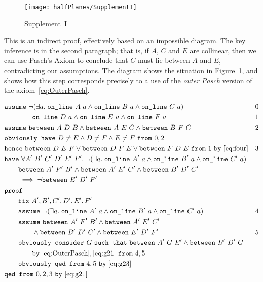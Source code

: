 \begin{figure}
  \centering\texttt{[image: halfPlanes/SupplementI]}
  \caption{Supplement~I}
  \label{fig:SupplementI}
\end{figure}

This is an indirect proof, effectively based on an impossible diagram. The key inference is in the second paragraph; that is, if $A$, $C$ and $E$ are collinear, then we can use Pasch's Axiom to conclude that $C$ must lie between $A$ and $E$, contradicting our assumptions. The diagram shows the situation in Figure~\ref{fig:SupplementI}, and shows how this step corresponds precisely to a use of the \emph{outer Pasch} version of the axiom~\eqref{eq:OuterPasch}.

\begin{boxedfigure}
  \small
  \begin{align*}
    &\code{assume}\ \Triangle{a}{A}{B}{C} & 0\\
    &\qquad\qquad \code{on\_line}\ D\ a \wedge \code{on\_line}\ E\ a \wedge \code{on\_line}\ F\ a & 1\\
    &\code{assume}\ \between{A}{D}{B} \wedge \between{A}{E}{C} \wedge \between{B}{F}{C} & 2\\
    &\code{obviously have}\ D\neq E \wedge D\neq F \wedge E\neq F\ \code{from}\ 0,2\\
    &\code{hence}\ \between{D}{E}{F}\vee\between{D}{F}{E}\vee\between{F}{D}{E}\ \code{from}\ 1\ \code{by} \ \eqref{eq:four}&3\\
    &\code{have}\ \forall A'\ B'\ C'\ D'\ E'\ F'.\; \Triangle{a}{A'}{B'}{C'}\\
    &\qquad \between{A'}{F'}{B'} \wedge \between{A'}{E'}{C'} \wedge \between{B'}{D'}{C'}\\
    &\qquad \implies \neg\between{E'}{D'}{F'}\\ 
    &\code{proof}\\
    &\qquad \code{fix}\ A',B',C',D',E',F'\\
    &\qquad \code{assume}\ \Triangle{a}{A'}{B'}{C'} & 4\\
    &\qquad \code{assume}\ \between{A'}{F'}{B'} \wedge \between{A'}{E'}{C'}\\ &\qquad\qquad\wedge\between{B'}{D'}{C'}\wedge\between{E'}{D'}{F'} & 5\\
    &\qquad\code{obviously consider}\ G\ \code{such that}\ \between{A'}{G}{E'} \wedge \between{B'}{D'}{G}\\ 
    &\qquad\qquad\code{by}\ \eqref{eq:OuterPasch},\eqref{eq:g21}\ \code{from}\ 4,5\\
    &\qquad\code{obviously qed from}\ 4,5\ \code{by}\ \eqref{eq:g23}\\
    &\code{qed from}\ 0,2,3\ \code{by}\ \eqref{eq:g21}
  \end{align*}
  \caption{Proof for Supplement~I}
  \label{fig:SupplementIProof}
\end{boxedfigure}

